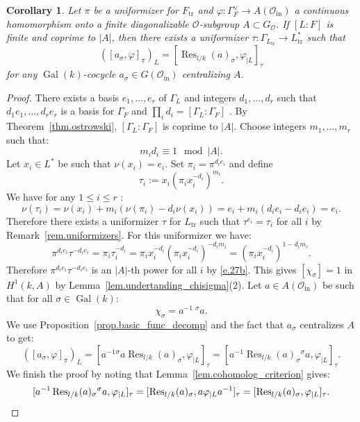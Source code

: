\documentclass[12pt]{amsart}
\numberwithin{equation}{section}
\newtheorem{corollary}[theorem]{Corollary}
\theoremstyle{definition}
\newcommand{\cO}{\mathcal{O}}
\newcommand{\Gal}{\operatorname{Gal}}
\newcommand{\tr}{\operatorname{tr}}
\newcommand{\Inf}{\operatorname{Res}}
\newcommand{\Ftr}{F_{\tr}}
\newcommand{\Ltr}{L_{\tr}}
\newcommand{\oin}{\operatorname{in}}
\newcommand{\Oin}{\cO_{\oin}}
\newcommand{\vphi}{\varphi}
\newcommand{\I}[1]{\Gamma_{#1}^{\vee}}
\begin{document}
\begin{corollary}\label{cor.choosing_uniformizers}
    Let $\pi$ be a uniformizer for $\Ftr$ and $\vphi: \I{F}\to A(\Oin)$ a continuous homomorphism onto a finite diagonalizable $\cO$-subgroup $A\subset G_{\cO}$. If $[L:F]$ is finite and coprime to $|A|$, then there exists a uniformizer $\tau: \Gamma_{\Ltr}\to \Ltr^*$ such that $$([a_\sigma,\vphi]_\pi)_L = [\Inf_{l/k}(a)_\sigma,\vphi_{|L}]_\tau$$ for any $\Gal(k)$-cocycle $a_\sigma\in G(\Oin)$ centralizing $A$.
\end{corollary}
\begin{proof}
There exists a basis $e_1,\dots,e_r$ of ${\Gamma}_L$ and integers $d_1,\dots,d_r$ such that $d_1 e_1,\dots,d_r e_r$ is a basis for $\Gamma_F$ and $\prod_i d_i = [{\Gamma}_L:\Gamma_F]$ \cite[Theorem III.7.8]{lang2002algebra}. By Theorem~\ref{thm.ostrowski}, $[\Gamma_L:\Gamma_F]$ is coprime to $|A|$. Choose integers $m_1,\dots,m_r$ such that:
\begin{equation}\label{e.27b}
    m_i d_i \equiv 1 \mod |A|.
\end{equation}
Let $x_i \in L^*$ be such that $\nu(x_i) = e_i$. Set $\pi_i = \pi^{d_i e_i}$ and define $$\tau_i :=  x_i (\pi_i x_i^{-d_i})^{m_i}.$$
We have for any $1\leq i\leq r$ :
$$\nu(\tau_i) = \nu(x_i) + m_i (\nu(\pi_i) - d_i\nu(x_i)) = e_i + m_i(d_i e_i - d_i e_i ) = e_i.$$
Therefore there exists a uniformizer $\tau$ for $\Ltr$ such that $\tau^{e_i} =\tau_i$ for all $i$ by Remark~\ref{rem.uniformizers}. For this uniformizer we have:
$$\pi^{d_i e_i} \tau^{-d_i e_i} = \pi_i \tau_i^{-d_i} = \pi_i x_i^{-d_i} (\pi_i x_i^{-d_i})^{-d_i m_i} = (\pi_i x_i^{-d_i})^{1-d_i m_i}.$$
Therefore $\pi^{d_i e_i} \tau^{-d_i e_i}$ is an $|A|$-th power for all $i$ by \eqref{e.27b}. This gives $[\chi_\sigma] =1$ in $H^1(k,A)$ by  Lemma~\ref{lem.undertanding_chisigma}(2). Let $a\in A(\Oin)$ be such that for all $\sigma\in \Gal(k)$:
$$\chi_\sigma = a^{-1}\ {}^{\sigma} a.$$
We use Proposition~\ref{prop.basic_func_decomp} and the fact that  $a_\sigma$ centralizes $A$ to get:
$$([a_\sigma,\vphi]_\pi)_L= [ a^{-1} {}^{\sigma} a \Inf_{l/k}(a)_\sigma,\vphi_{|L}]_\tau= [a^{-1} \Inf_{l/k}(a)_\sigma {}^{\sigma} a,\vphi_{|L}]_\tau.$$
We finish the proof by noting that Lemma~\ref{lem.cohomolog_criterion} gives:
\[[a^{-1} \Inf_{l/k}(a)_\sigma {}^{\sigma} a,\vphi_{|L}]_\tau= [\Inf_{l/k}(a)_\sigma,a \vphi_{|L}a^{-1}]_\tau= [\Inf_{l/k}(a)_\sigma,\vphi_{|L}]_\tau.\qedhere\]
\end{proof}
\end{document}
